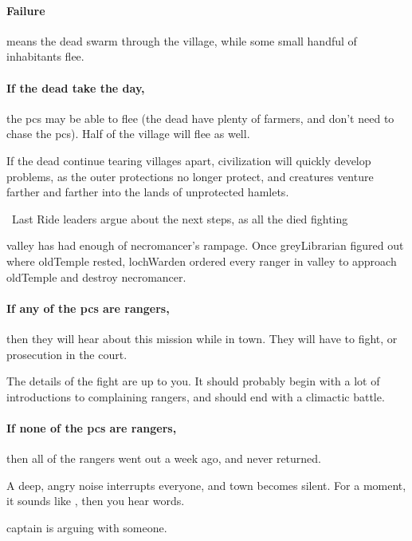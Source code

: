 \paragraph{Failure}
means the dead swarm through the \gls{village}, while some small handful of inhabitants flee.

\paragraph{If the dead take the day,}
the \glspl{pc} may be able to flee (the dead have plenty of farmers, and don't need to chase the \glspl{pc}).
Half of the \gls{village} will flee as well.

If the dead continue tearing \glspl{village} apart, civilization will quickly develop problems, as the outer protections no longer protect, and creatures venture farther and farther into the lands of unprotected hamlets.

{\squash\ Last Ride}%
{ leaders argue about the next steps, as all the  died fighting }%

\Gls{valley} has had enough of \gls{necromancer}'s rampage.
Once \gls{greyLibrarian} figured out where \gls{oldTemple} rested, \gls{lochWarden} ordered every \gls{ranger} in \gls{valley} to approach \gls{oldTemple} and destroy \gls{necromancer}.

\paragraph{If any of the \glspl{pc} are \glspl{ranger},}
then they will hear about this mission while in \gls{town}.
They will have to fight, or prosecution in the \gls{court}.

The details of the fight are up to you.
It should probably begin with a lot of introductions to complaining \glspl{ranger}, and should end with a climactic battle.

\paragraph{If none of the \glspl{pc} are \glspl{ranger},}
then all of the \glspl{ranger} went out a week ago, and never returned.

\begin{boxtext}
  A deep, angry noise interrupts everyone, and \gls{town} becomes silent.
  For a moment, it sounds like , then you hear words.

  \Gls{captain} is arguing with someone.
\end{boxtext}

